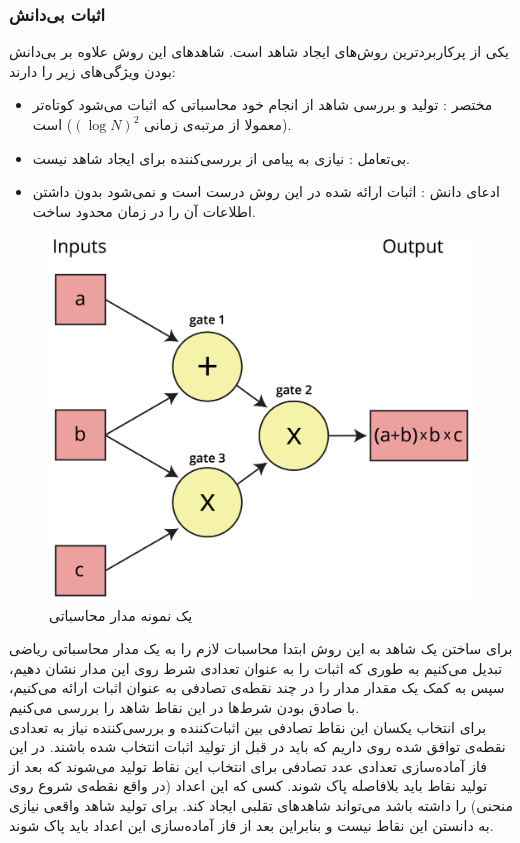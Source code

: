 \subsubsection{اثبات بی‌دانش }
یکی از پرکاربردترین روش‌های ایجاد شاهد 
است. شاهد‌های این روش علاوه بر بی‌دانش بودن ویژگی‌های زیر را دارند:
\begin{itemize}
	\item 
	مختصر
	: تولید و بررسی شاهد از انجام خود محاسباتی که اثبات می‌شود کوتاه‌تر (معمولا از مرتبه‌ی زمانی $ (\log N) ^ 2$) است. 
	\item
	بی‌تعامل
	: نیازی به پیامی از بررسی‌کننده برای ایجاد شاهد نیست. 
	\item
	ادعای دانش
	: اثبات ارائه شده در این روش درست 
	است و نمی‌شود بدون داشتن اطلاعات آن را در زمان محدود ساخت.
	
\end{itemize}
 
\begin{figure}[bh]
	\centering
	\includegraphics[width=.5\linewidth]{arithmetic-circuit.png}
	\caption {یک نمونه مدار محاسباتی}
	\label{fig:arithmetic}
\end{figure}

برای ساختن یک شاهد به این روش ابتدا محاسبات لازم را به یک مدار محاسباتی ریاضی تبدیل می‌کنیم به طوری که اثبات را به عنوان تعدادی شرط روی این مدار نشان دهیم، سپس به کمک یک
مقدار مدار را در چند نقطه‌ی تصادفی به عنوان اثبات ارائه می‌کنیم، با صادق بودن شرط‌ها در این نقاط شاهد را بررسی می‌کنیم. 
\\
برای انتخاب یکسان این نقاط تصادفی بین اثبات‌کننده و بررسی‌کننده نیاز به تعدادی نقطه‌ی توافق شده روی  داریم که باید در قبل از تولید اثبات انتخاب شده باشند. در این فاز آماده‌سازی تعدادی عدد تصادفی برای انتخاب این نقاط تولید می‌شوند که بعد از تولید نقاط باید بلافاصله پاک شوند. کسی که این اعداد (در واقع نقطه‌ی شروع روی منحنی) را داشته باشد می‌تواند شاهد‌های تقلبی ایجاد کند. برای تولید شاهد واقعی نیازی به دانستن این نقاط نیست و بنابراین بعد از فاز آماده‌سازی این اعداد باید پاک شوند. 
